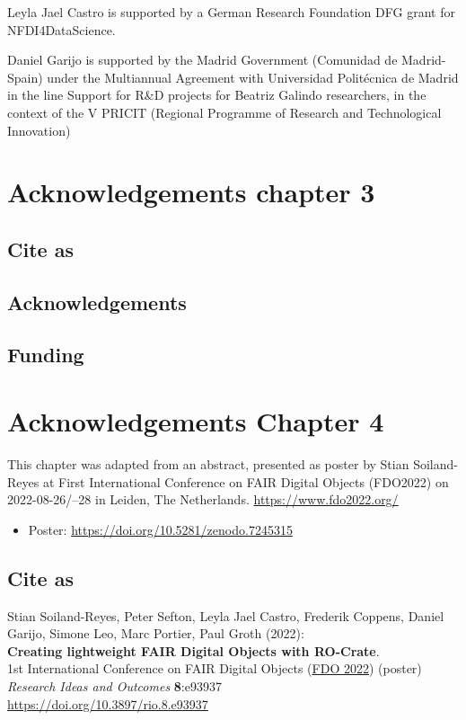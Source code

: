 Leyla Jael Castro is supported by a German Research Foundation DFG grant
for NFDI4DataScience.

Daniel Garijo is supported by the Madrid Government (Comunidad de
Madrid-Spain) under the Multiannual Agreement with Universidad
Politécnica de Madrid in the line Support for R\&D projects for Beatriz
Galindo researchers, in the context of the V PRICIT (Regional Programme
of Research and Technological Innovation)


\section{Acknowledgements chapter 3}

\subsection*{Cite as}

\subsection*{Acknowledgements}

\subsection*{Funding}




\section{Acknowledgements Chapter 4}

This chapter was adapted from an abstract, 
presented as poster by Stian Soiland-Reyes at 
First International Conference on FAIR Digital Objects 
(FDO2022) on
2022-08-26/--28 in Leiden, The Netherlands. 
\url{https://www.fdo2022.org/}

\begin{itemize}
\tightlist
\item
  Poster: \url{https://doi.org/10.5281/zenodo.7245315}
\end{itemize}

\subsection*{Cite as}
Stian Soiland-Reyes, Peter Sefton, Leyla Jael Castro, Frederik Coppens,
Daniel Garijo, Simone Leo, Marc Portier, Paul Groth (2022):\\
\textbf{Creating lightweight FAIR Digital Objects with RO-Crate}.\\
1st International Conference on FAIR Digital Objects
(\href{https://www.fdo2022.org/}{FDO 2022}) (poster)\\
\emph{Research Ideas and Outcomes} \textbf{8}:e93937\\
\url{https://doi.org/10.3897/rio.8.e93937}

